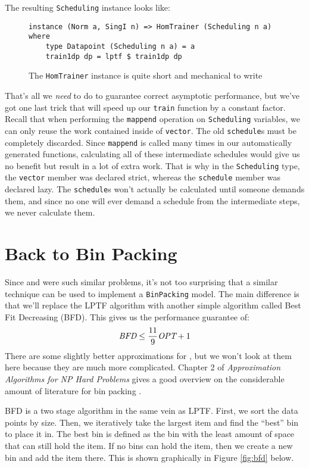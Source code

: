 \documentclass[tikz]{tmr}
\newcommand\h{\lstinline}
\newcommand{\prob}[1]{{\sc {#1}}}
\newcommand\+{\mdoubleplus}
\begin{document}
The resulting \h{Scheduling} instance looks like:
\begin{figure}[H]
\begin{lstlisting}
instance (Norm a, SingI n) => HomTrainer (Scheduling n a) where
    type Datapoint (Scheduling n a) = a
    train1dp dp = lptf $ train1dp dp
\end{lstlisting}
\caption{The \h{HomTrainer} instance is quite short and mechanical to write}
\end{figure}
That's all we \textit{need} to do to guarantee correct asymptotic performance, but we've got one last trick that will speed up our \h{train} function by a constant factor.
Recall that when performing the \h{mappend} operation on \h{Scheduling} variables, we can only reuse the work contained inside of \h{vector}.
The old \h{schedule}s must be completely discarded.
Since \h{mappend} is called many times in our automatically generated functions, calculating all of these intermediate schedules would give us no benefit but result in a lot of extra work.
That is why in the \h{Scheduling} type, the \h{vector} member was declared strict, whereas the \h{schedule} member was declared lazy.
The \h{schedule}s won't actually be calculated until someone demands them, and since no one will ever demand a schedule from the intermediate steps, we never calculate them.

\section{Back to Bin Packing}

Since \prob{BinPacking} and \prob{Scheduling} were such similar problems, it's not too surprising that a similar technique can be used to implement a \h{BinPacking} model.
The main difference is that we'll replace the LPTF algorithm with another simple algorithm called Best Fit Decreasing (BFD).  This gives us the performance guarantee of:
$$
\textit{BFD} \le {11\over9}\textit{OPT} + 1
$$
There are some slightly better approximations for \prob{BinPacking}, but we won't look at them here because they are much more complicated.
Chapter 2 of \textit{Approximation Algorithms for NP Hard Problems} gives a good overview on the considerable amount of literature for bin packing \cite{hochbaum96binpacking}.

BFD is a two stage algorithm in the same vein as LPTF.
First, we sort the data points by size.
Then, we iteratively take the largest item and find the ``best'' bin to place it in.
The best bin is defined as the bin with the least amount of space that can still hold the item.
If no bins can hold the item, then we create a new bin and add the item there.
This is shown graphically in Figure \ref{fig:bfd} below.
\end{document}
